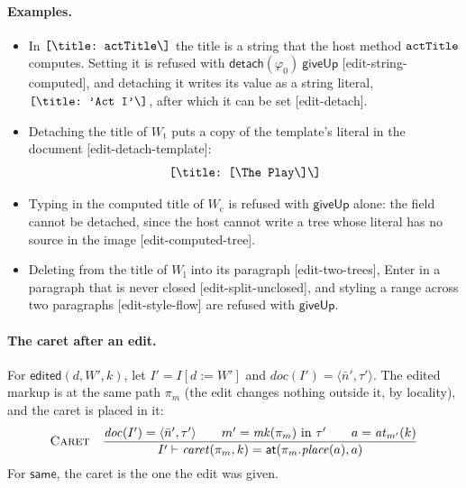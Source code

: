 \documentclass[11pt]{article}
\numberwithin{equation}{section}
\newcommand{\kw}[1]{\ensuremath{\mathsf{#1}}}
\newcommand{\str}[1]{\ensuremath{\text{\texttt{#1}}}}
\newcommand{\bs}{\textbackslash}
\newcommand{\rulelabel}[1]{\textsc{#1}}
\begin{document}
\paragraph{Examples.}
\begin{itemize}
\item In $\str{[\bs{}title:\ actTitle\bs]}$ the title is a string that the
      host method $\str{actTitle}$ computes.  Setting it is refused with
      $\kw{detach}(\varphi_0)\ \kw{giveUp}$ [edit-string-computed], and
      detaching it writes its value as a string literal,
      $\str{[\bs{}title:\ 'Act\ I'\bs]}$, after which it can be set
      [edit-detach].
\item Detaching the title of $W_{\mathrm{t}}$ puts a copy of the
      template's literal in the document [edit-detach-template]:
      \[
      \str{[\bs{}title:\ [\bs{}The\ Play\bs]\bs]}
      \]
\item Typing in the computed title of $W_{\mathrm{c}}$ is refused with
      $\kw{giveUp}$ alone: the field cannot be detached, since the host
      cannot write a tree whose literal has no source in the image
      [edit-computed-tree].
\item Deleting from the title of $W_{\mathrm{l}}$ into its paragraph
      [edit-two-trees], Enter in a paragraph that is never closed
      [edit-split-unclosed], and styling a range across two paragraphs
      [edit-style-flow] are refused with $\kw{giveUp}$.
\end{itemize}


\paragraph{The caret after an edit.}  For $\kw{edited}(d, W', k)$, let $I'
= I[d := W']$ and $\mathit{doc}(I') = \langle \bar n', \tau' \rangle$.  The
edited markup is at the same path $\pi_m$ (the edit changes nothing outside
it, by locality), and the caret is placed in it:
\begin{gather}
\rulelabel{Caret}\quad
\frac{\mathit{doc}(I') = \langle \bar n', \tau' \rangle \qquad
      m' = \mathit{mk}(\pi_m) \text{ in } \tau' \qquad
      a = \mathit{at}_{m'}(k)}
     {I' \vdash \mathit{caret}(\pi_m, k) = \kw{at}(\pi_m.\mathit{place}(a), a)}
\end{gather}
For $\kw{same}$, the caret is the one the edit was given.
\end{document}
